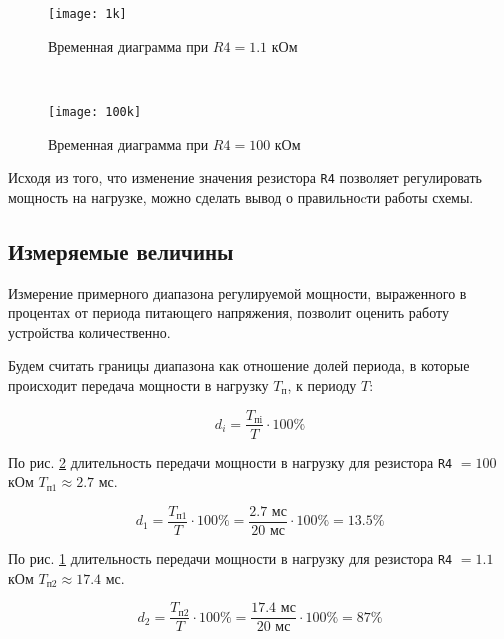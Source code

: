 \begin{figure}[H]
\begin{center}
	\texttt{[image: 1k]}
	\caption{Временная диаграмма при $R4 = 1.1$ кОм}
	\label{pic:diag:1k}
\end{center}
\end{figure}

~

\begin{figure}[H]
\begin{center}
	\texttt{[image: 100k]}
	\caption{Временная диаграмма при $R4 = 100$ кОм}
	\label{pic:diag:100k}
\end{center}
\end{figure}

Исходя из того, что изменение значения резистора \verb+R4+ позволяет регулировать мощность на нагрузке, можно сделать вывод о правильноcти работы схемы.

\subsection{Измеряемые величины}

Измерение примерного диапазона регулируемой мощности, выраженного в процентах от периода питающего напряжения, позволит оценить работу устройства количественно.

Будем считать границы диапазона как отношение долей периода, в которые происходит передача мощности в нагрузку $T_\text{п}$, к периоду $T$:

\begin{equation}
	d_i = \frac{T_\text{пi}}{T} \cdot 100\%
\end{equation}

По рис. \ref{pic:diag:100k} длительность передачи мощности в нагрузку для резистора \verb+R4+ $=100$ кОм $T_\text{п1} \approx 2.7$ мс.

\begin{displaymath}
	d_1 = \frac{T_\text{п1}}{T} \cdot 100\% = \frac{2.7 \text{ мс}}{20\text{ мс}} \cdot 100\% = 13.5 \%
\end{displaymath}

По рис. \ref{pic:diag:1k} длительность передачи мощности в нагрузку для резистора \verb+R4+ $=1.1$ кОм $T_\text{п2} \approx 17.4$ мс.

\begin{displaymath}
	d_2 = \frac{T_\text{п2}}{T} \cdot 100\% = \frac{17.4 \text{ мс}}{20\text{ мс}} \cdot 100\% = 87 \%
\end{displaymath}

